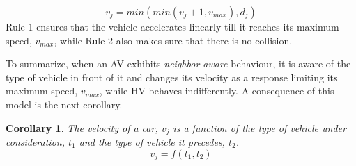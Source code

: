 \documentclass[oneside,letter,11pt]{article}
\newtheorem{corollary}{Corollary}
\begin{document}
\begin{itemize}
{\begin{equation}
            v_j = min(min(v_j + 1, v_{max}), d_j) 
\end{equation}
Rule 1 ensures that the vehicle accelerates linearly till it reaches its maximum speed, $v_{max}$, while Rule 2 also makes sure that there is no collision.\\ }

\end{itemize}

To summarize, when an AV exhibits \textit{neighbor aware} behaviour, it is aware of the type of vehicle in front of it and changes its velocity as a response limiting its maximum speed, $v_{max}$, while HV behaves indifferently. A consequence of this model is the next corollary.
 \begin{corollary} The velocity of a car, $v_j$ is a function of the type of vehicle under consideration, $t_1$ and the type of vehicle it precedes, $t_2$.
  \[ v_j = f(t_1, t_2) \]
\end{corollary}
\end{document}
